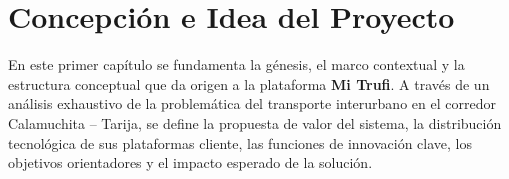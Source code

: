 \section{Concepción e Idea del Proyecto}

En este primer capítulo se fundamenta la génesis, el marco contextual y la estructura conceptual que da origen a la plataforma \textbf{Mi Trufi}. A través de un análisis exhaustivo de la problemática del transporte interurbano en el corredor Calamuchita -- Tarija, se define la propuesta de valor del sistema, la distribución tecnológica de sus plataformas cliente, las funciones de innovación clave, los objetivos orientadores y el impacto esperado de la solución.













